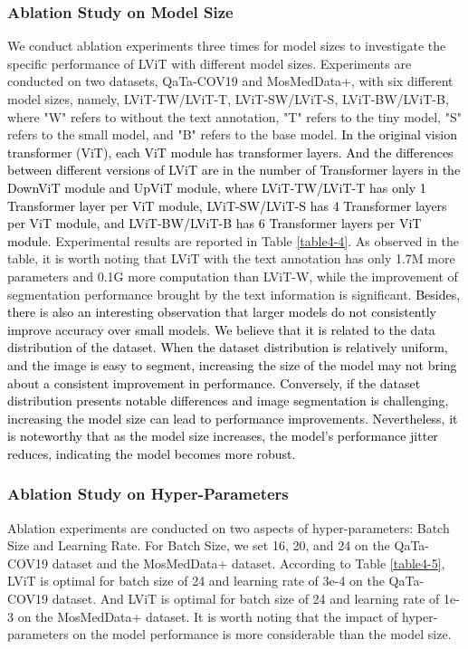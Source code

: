 \documentclass[lettersize,journal]{IEEEtran}
\begin{document}
\subsubsection{Ablation Study on Model Size}
We conduct ablation experiments three times for model sizes to investigate the specific performance of LViT with different model sizes. Experiments are conducted on two datasets, QaTa-COV19 and MosMedData+, with six different model sizes, namely, LViT-TW/LViT-T, LViT-SW/LViT-S, LViT-BW/LViT-B, where "W" refers to without the text annotation, "T" refers to the tiny model, "S" refers to the small model, and "B" refers to the base model. 
\textcolor{black}{In the original vision transformer (ViT)\cite{42dosovitskiy2020image}, each ViT module has  transformer layers. And the differences between different versions of LViT are in the number of Transformer layers in the DownViT module and UpViT module, where LViT-TW/LViT-T has only 1 Transformer layer per ViT module, LViT-SW/LViT-S has 4 Transformer layers per ViT module, and LViT-BW/LViT-B has 6 Transformer layers per ViT module.} Experimental results are reported in Table \ref{table4-4}.
As observed in the table, it is worth noting that LViT with the text annotation has only 1.7M more parameters and 0.1G more computation than LViT-W, while the improvement of segmentation performance brought by the text information is significant. 
\textcolor{black}{
Besides, there is also an interesting observation that larger models do not consistently improve accuracy over small models. We believe that it is related to the data distribution of the dataset. When the dataset distribution is relatively uniform, and the image is easy to segment, increasing the size of the model may not bring about a consistent improvement in performance. Conversely, if the dataset distribution presents notable differences and image segmentation is challenging, increasing the model size can lead to performance improvements. Nevertheless, it is noteworthy that as the model size increases, the model's performance jitter reduces, indicating the model becomes more robust.}

\subsubsection{Ablation Study on Hyper-Parameters}
Ablation experiments are conducted on two aspects of hyper-parameters: Batch Size and Learning Rate. For Batch Size, we set 16, 20, and 24 on the QaTa-COV19 dataset and the MosMedData+ dataset. According to Table \ref{table4-5}, LViT is optimal for batch size of 24 and learning rate of 3e-4 on the QaTa-COV19 dataset. And LViT is optimal for batch size of 24 and learning rate of 1e-3 on the MosMedData+ dataset. It is worth noting that the impact of hyper-parameters on the model performance is more considerable than the model size.
\end{document}
